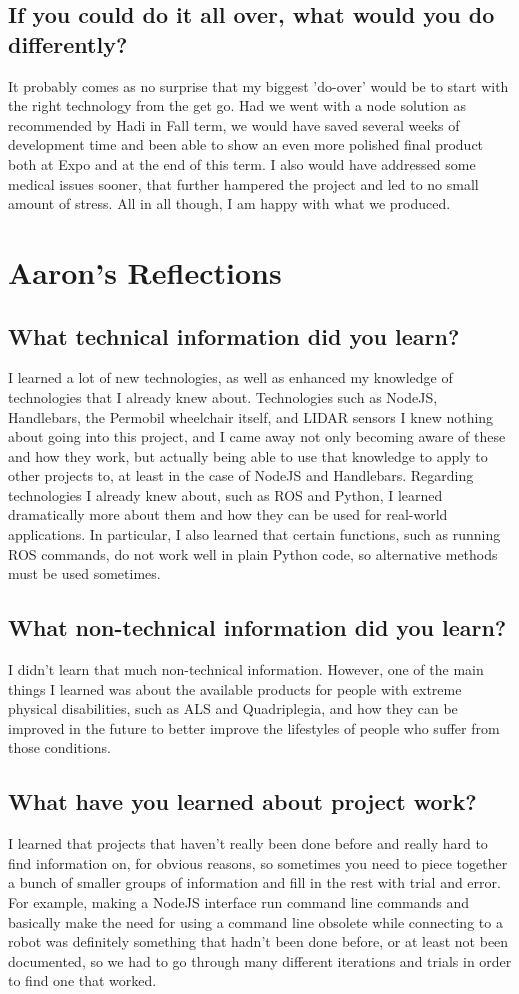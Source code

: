 \documentclass[onecolumn, draftclsnofoot,10pt, compsoc]{report}
\begin{document}
\subsection{If you could do it all over, what would you do differently?}
It probably comes as no surprise that my biggest 'do-over' would be to start with the right technology from the get go. Had we went with a node solution as recommended by Hadi in Fall term, we would have saved several weeks of development time and been able to show an even more polished final product both at Expo and at the end of this term. I also would have addressed some medical issues sooner, that further hampered the project and led to no small amount of stress. All in all though, I am happy with what we produced. 
\section{Aaron's Reflections}
\subsection{What technical information did you learn?}
I learned a lot of new technologies, as well as enhanced my knowledge of technologies that I already knew about. Technologies such as NodeJS, Handlebars, the Permobil wheelchair itself, and LIDAR sensors I knew nothing about going into this project, and I came away not only becoming aware of these and how they work, but actually being able to use that knowledge to apply to other projects to, at least in the case of NodeJS and Handlebars. Regarding technologies I already knew about, such as ROS and Python, I learned dramatically more about them and how they can be used for real-world applications. In particular, I also learned that certain functions, such as running ROS commands, do not work well in plain Python code, so alternative methods must be used sometimes.
\subsection{What non-technical information did you learn?}
I didn't learn that much non-technical information. However, one of the main things I learned was about the available products for people with extreme physical disabilities, such as ALS and Quadriplegia, and how they can be improved in the future to better improve the lifestyles of people who suffer from those conditions.
\subsection{What have you learned about project work?}
I learned that projects that haven't really been done before and really hard to find information on, for obvious reasons, so sometimes you need to piece together a bunch of smaller groups of information and fill in the rest with trial and error. For example, making a NodeJS interface run command line commands and basically make the need for using a command line obsolete while connecting to a robot was definitely something that hadn't been done before, or at least not been documented, so we had to go through many different iterations and trials in order to find one that worked.
\end{document}
